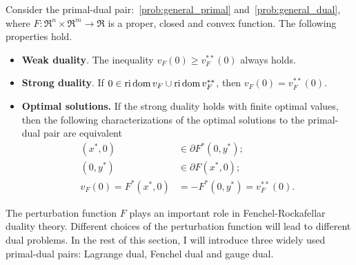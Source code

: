 \begin{theorem} Consider the primal-dual pair:~\eqref{prob:general_primal} and~\eqref{prob:general_dual}, where $F: \Re^n \times \Re^m \to \Re$ is a proper, closed and convex function. The following properties hold. 
    \begin{itemize}
        \item \textbf{Weak duality}. The inequality $v_F(0) \geq v_F^{**}(0)$ always holds. 
        \item \textbf{Strong duality}. If $0 \in \operatorname{ri}\operatorname{dom} v_F \cup \operatorname{ri}\operatorname{dom} v_F^{**}$, then $v_F(0) = v_F^{**}(0)$. 
        \item \textbf{Optimal solutions.} If the strong duality holds with finite optimal values, then the following characterizations of the optimal solutions to the primal-dual pair are equivalent
            \begin{align}
                (x^*, 0) &\in \partial F^*(0,y^*); \\
                (0, y^*) &\in \partial F(x^*,0); \\
                v_F(0) = F^*(x^*, 0) &= -F^*(0,y^*) = v_F^{**}(0).
            \end{align}
    \end{itemize}
\end{theorem}

The perturbation function $F$ plays an important role in Fenchel-Rockafellar duality theory. Different choices of the perturbation function will lead to different dual problems. In the rest of this section, I will introduce three widely used primal-dual pairs: Lagrange dual, Fenchel dual and gauge dual. 


